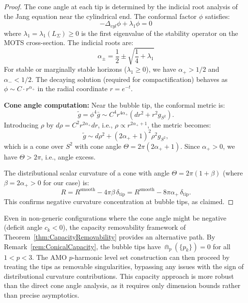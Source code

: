 \begin{proof}
The cone angle at each tip is determined by the indicial root analysis of the Jang equation near the cylindrical end. The conformal factor $\phi$ satisfies:
\begin{equation}
    -\Delta_{cyl} \phi + \lambda_1 \phi = 0
\end{equation}
where $\lambda_1 = \lambda_1(L_\Sigma) \ge 0$ is the first eigenvalue of the stability operator on the MOTS cross-section. The indicial roots are:
\begin{equation}
    \alpha_\pm = \frac{1}{2} \pm \sqrt{\frac{1}{4} + \lambda_1}
\end{equation}
For stable or marginally stable horizons ($\lambda_1 \ge 0$), we have $\alpha_+ > 1/2$ and $\alpha_- < 1/2$. The decaying solution (required for compactification) behaves as $\phi \sim C \cdot r^{\alpha_+}$ in the radial coordinate $r = e^{-t}$.

\textbf{Cone angle computation:} Near the bubble tip, the conformal metric is:
\begin{equation}
    \tilde{g} = \phi^4 \bar{g} \sim C^4 r^{4\alpha_+} (dr^2 + r^2 g_{S^2}).
\end{equation}
Introducing $\rho$ by $d\rho = C^2 r^{2\alpha_+} dr$, i.e., $\rho \propto r^{2\alpha_+ + 1}$, the metric becomes:
\begin{equation}
    \tilde{g} \sim d\rho^2 + (2\alpha_+ + 1)^2 \rho^2 g_{S^2},
\end{equation}
which is a cone over $S^2$ with cone angle $\Theta = 2\pi(2\alpha_+ + 1)$. Since $\alpha_+ > 0$, we have $\Theta > 2\pi$, i.e., angle excess.

The distributional scalar curvature of a cone with angle $\Theta = 2\pi(1 + \beta)$ (where $\beta = 2\alpha_+ > 0$ for our case) is:
\begin{equation}
    R = R^{\text{smooth}} - 4\pi\beta \, \delta_{\text{tip}} = R^{\text{smooth}} - 8\pi\alpha_+ \, \delta_{\text{tip}}.
\end{equation}
This confirms negative curvature concentration at bubble tips, as claimed.
\end{proof}

\begin{remark}\label{rem:ConeAngleCapacity}
Even in non-generic configurations where the cone angle might be negative (deficit angle $c_k < 0$), the capacity removability framework of Theorem~\ref{thm:CapacityRemovability} provides an alternative path. By Remark~\ref{rem:ConicalCapacity}, the bubble tips have $\Cap_p(\{p_k\}) = 0$ for all $1 < p < 3$. The AMO $p$-harmonic level set construction can then proceed by treating the tips as removable singularities, bypassing any issues with the sign of distributional curvature contributions. This capacity approach is more robust than the direct cone angle analysis, as it requires only dimension bounds rather than precise asymptotics.
\end{remark}

